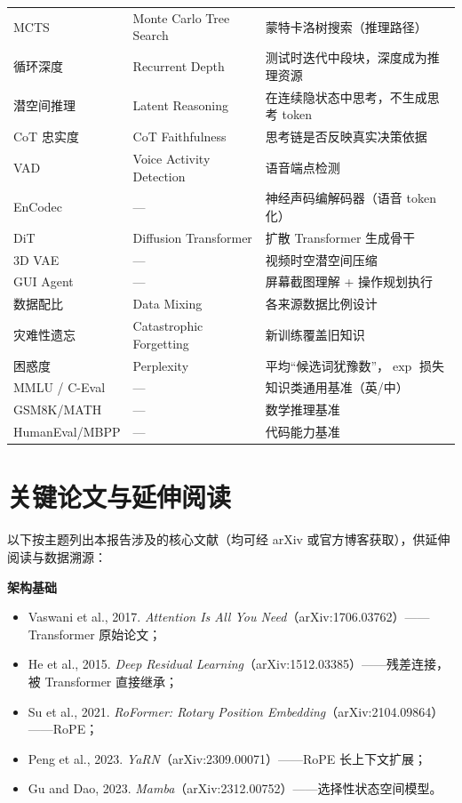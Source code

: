 \documentclass[12pt,a4paper]{article}
\begin{document}
\begin{longtable}{@{}>{\raggedright\arraybackslash}p{3.6cm}>{\raggedright\arraybackslash}p{4.6cm}p{6.8cm}@{}}
MCTS & Monte Carlo Tree Search & 蒙特卡洛树搜索（推理路径）\\
循环深度 & Recurrent Depth & 测试时迭代中段块，深度成为推理资源\\
潜空间推理 & Latent Reasoning & 在连续隐状态中思考，不生成思考 token\\
CoT 忠实度 & CoT Faithfulness & 思考链是否反映真实决策依据\\
VAD & Voice Activity Detection & 语音端点检测\\
EnCodec & — & 神经声码编解码器（语音 token 化）\\
DiT & Diffusion Transformer & 扩散 Transformer 生成骨干\\
3D VAE & — & 视频时空潜空间压缩\\
GUI Agent & — & 屏幕截图理解 + 操作规划执行\\
数据配比 & Data Mixing & 各来源数据比例设计\\
灾难性遗忘 & Catastrophic Forgetting & 新训练覆盖旧知识\\
困惑度 & Perplexity & 平均“候选词犹豫数”，$\exp$ 损失\\
MMLU / C-Eval & — & 知识类通用基准（英/中）\\
GSM8K/MATH & — & 数学推理基准\\
HumanEval/MBPP & — & 代码能力基准\\
\end{longtable}

\newpage
\section{关键论文与延伸阅读}

\sloppy  %

以下按主题列出本报告涉及的核心文献（均可经 arXiv 或官方博客获取），供延伸阅读与数据溯源：

\textbf{架构基础}
\begin{itemize}
  \item Vaswani et al., 2017. \emph{Attention Is All You Need}（arXiv:1706.03762）——Transformer 原始论文；
  \item He et al., 2015. \emph{Deep Residual Learning}（arXiv:1512.03385）——残差连接，被 Transformer 直接继承；
  \item Su et al., 2021. \emph{RoFormer: Rotary Position Embedding}（arXiv:2104.09864）——RoPE；
  \item Peng et al., 2023. \emph{YaRN}（arXiv:2309.00071）——RoPE 长上下文扩展；
  \item Gu and Dao, 2023. \emph{Mamba}（arXiv:2312.00752）——选择性状态空间模型。
\end{itemize}
\end{document}
